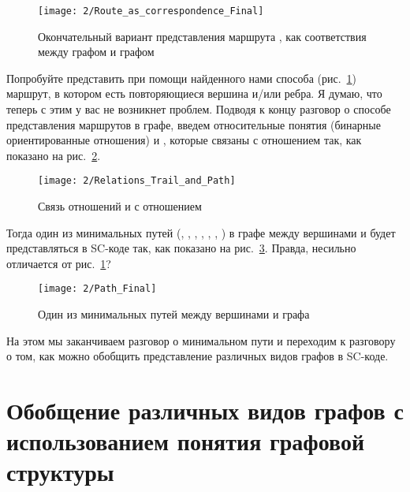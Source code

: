 \begin{figure}[h!]
  \centering
  \texttt{[image: 2/Route\_as\_correspondence\_Final]}
  \caption{Окончательный вариант представления маршрута , как
    соответствия между графом  и графом }
  \label{fig:Route_as_correspondence_Final}
\end{figure}

Попробуйте представить при помощи найденного нами способа
(рис.~\ref{fig:Route_as_correspondence_Final}) маршрут, в котором есть
повторяющиеся вершина и/или ребра. Я думаю, что теперь с этим у вас не
возникнет проблем. Подводя к концу разговор о способе представления
маршрутов в графе, введем относительные понятия (бинарные
ориентированные отношения)  и , которые
связаны с отношением  так, как показано на
рис.~\ref{fig:Relations_Trail_and_Path}.

\begin{figure}[h!]
  \centering
  \texttt{[image: 2/Relations\_Trail\_and\_Path]}
  \caption{Связь отношений  и  с отношением
    }
  \label{fig:Relations_Trail_and_Path}
\end{figure}

Тогда один из минимальных путей  (, ,
, , , , ) в графе
 между вершинами  и  будет представляться в
SC-коде так, как показано на рис.~\ref{fig:Path_Final}. Правда,
несильно отличается от рис.~\ref{fig:Route_as_correspondence_Final}?

\begin{figure}[h!]
  \centering
  \texttt{[image: 2/Path\_Final]}
  \caption{Один из минимальных путей  между вершинами 
    и  графа }
  \label{fig:Path_Final}
\end{figure}

На этом мы заканчиваем разговор о минимальном пути и переходим к
разговору о том, как можно обобщить представление различных видов
графов в SC-коде.

\section{Обобщение различных видов графов с использованием понятия
  графовой структуры}
\label{sec:Onto_graph_struct}

